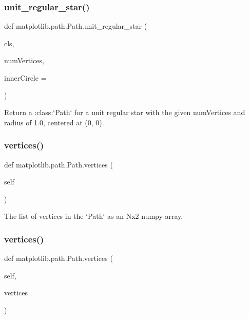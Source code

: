 \subsubsection{\texorpdfstring{unit\+\_\+regular\+\_\+star()}{unit\_regular\_star()}}
{\footnotesize\ttfamily def matplotlib.\+path.\+Path.\+unit\+\_\+regular\+\_\+star (\begin{DoxyParamCaption}\item[{}]{cls,  }\item[{}]{num\+Vertices,  }\item[{}]{inner\+Circle = {} }\end{DoxyParamCaption})}

\begin{DoxyVerb}Return a :class:`Path` for a unit regular star with the given
numVertices and radius of 1.0, centered at (0, 0).
\end{DoxyVerb}
 \mbox{\label{classmatplotlib_1_1path_1_1Path_a16d8c6332dee86b7ccd33eda804c5943}} 
\subsubsection{\texorpdfstring{vertices()}{vertices()}\hspace{0.1cm}{\footnotesize\ttfamily [1/2]}}
{\footnotesize\ttfamily def matplotlib.\+path.\+Path.\+vertices (\begin{DoxyParamCaption}\item[{}]{self }\end{DoxyParamCaption})}

\begin{DoxyVerb}The list of vertices in the `Path` as an Nx2 numpy array.
\end{DoxyVerb}
 \mbox{\label{classmatplotlib_1_1path_1_1Path_a9fb4403d765b7c184105742f91300db9}} 
\subsubsection{\texorpdfstring{vertices()}{vertices()}\hspace{0.1cm}{\footnotesize\ttfamily [2/2]}}
{\footnotesize\ttfamily def matplotlib.\+path.\+Path.\+vertices (\begin{DoxyParamCaption}\item[{}]{self,  }\item[{}]{vertices }\end{DoxyParamCaption})}

